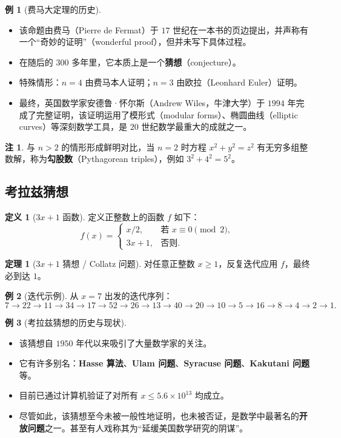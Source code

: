 \documentclass[UTF8,11pt,a4paper]{ctexbook}   %
\theoremstyle{definition}
\newtheorem{definition}{定义}[section]
\newtheorem{theorem}{定理}[section]
\newtheorem{example}{例}[section]
\newtheorem{remark}{注}[section]
\begin{document}
\begin{example}[费马大定理的历史]
\begin{itemize}
    \item 该命题由费马（Pierre de Fermat）于 $17$ 世纪在一本书的页边提出，并声称有一个``奇妙的证明''（wonderful proof），但并未写下具体过程。
    \item 在随后的 $300$ 多年里，它本质上是一个\textbf{猜想}（conjecture）。
    \item 特殊情形：$n=4$ 由费马本人证明；$n=3$ 由欧拉（Leonhard Euler）证明。
    \item 最终，英国数学家安德鲁·怀尔斯（Andrew Wiles，牛津大学）于 $1994$ 年完成了完整证明，该证明运用了模形式（modular forms）、椭圆曲线（elliptic curves）等深刻数学工具，是 $20$ 世纪数学最重大的成就之一。
\end{itemize}
\end{example}

\begin{remark}
与 $n>2$ 的情形形成鲜明对比，当 $n=2$ 时方程 $x^2+y^2=z^2$ 有无穷多组整数解，称为\textbf{勾股数}（Pythagorean triples），例如 $3^2+4^2=5^2$。
\end{remark}

\subsection{考拉兹猜想}

\begin{definition}[$3x+1$ 函数]
定义正整数上的函数 $f$ 如下：
\[
f(x) = 
\begin{cases}
x/2, & \text{若 } x \equiv 0 \pmod{2},\\[0.3em]
3x+1, & \text{否则}.
\end{cases}
\]
\end{definition}

\begin{theorem}[$3x+1$ 猜想 / Collatz 问题]
对任意正整数 $x \geq 1$，反复迭代应用 $f$，最终必到达 $1$。
\end{theorem}

\begin{example}[迭代示例]
从 $x=7$ 出发的迭代序列：
\[
7 \to 22 \to 11 \to 34 \to 17 \to 52 \to 26 \to 13 \to 40 \to 20 \to 10 \to 5 \to 16 \to 8 \to 4 \to 2 \to 1.
\]
\end{example}

\begin{example}[考拉兹猜想的历史与现状]
\begin{itemize}
    \item 该猜想自 $1950$ 年代以来吸引了大量数学家的关注。
    \item 它有许多别名：\textbf{Hasse 算法}、\textbf{Ulam 问题}、\textbf{Syracuse 问题}、\textbf{Kakutani 问题}等。
    \item 目前已通过计算机验证了对所有 $x \leq 5.6 \times 10^{13}$ 均成立。
    \item 尽管如此，该猜想至今未被一般性地证明，也未被否证，是数学中最著名的\textbf{开放问题}之一。甚至有人戏称其为``延缓美国数学研究的阴谋''。
\end{itemize}
\end{example}
\end{document}
